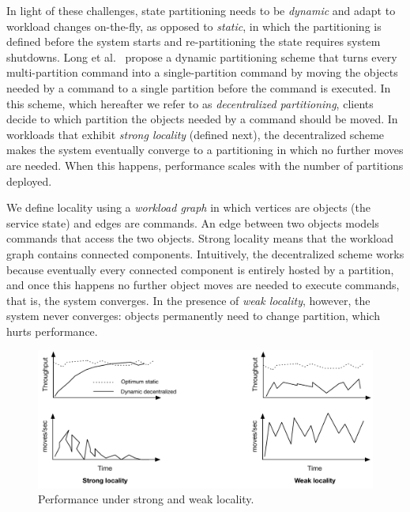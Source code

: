 In light of these challenges, state partitioning needs to be
\emph{dynamic} and adapt to workload changes on-the-fly, as opposed to
\emph{static}, in which the partitioning is defined before the system
starts and re-partitioning the state requires system shutdowns.  Long
et al.~\cite{hoang2016} propose a dynamic partitioning scheme that
turns every multi-partition command into a single-partition command by
moving the objects needed by a command to a single partition before
the command is executed.  In this scheme, which hereafter we refer to
as \emph{decentralized partitioning}, clients decide to which
partition the objects needed by a command should be moved.  In
workloads that exhibit \emph{strong locality} (defined next), the
decentralized scheme makes the system eventually converge to a
partitioning in which no further moves are needed.  When this happens,
performance scales with the number of partitions deployed.








We define locality using a \emph{workload graph} in which vertices are
objects (the service state) and edges are commands.
An edge between two objects models commands that access the two
objects.  Strong locality means that the workload graph contains
connected components.  Intuitively, the decentralized scheme works
because eventually every connected component is entirely hosted by a
partition, and once this happens no further object moves are needed to
execute commands, that is, the system converges.  In the presence of
\emph{weak locality}, however, the system never converges: objects
permanently need to change partition, which hurts performance.

\begin{figure}[ht]
	\center
	\includegraphics[width=0.6\linewidth]{figures/motivation}
	\caption{Performance under strong and weak locality.}
	\label{fig:motivation}
\end{figure}




